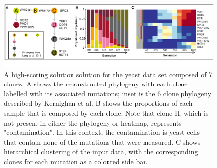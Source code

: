 \documentclass[a4paper]{article}\usepackage[]{graphicx}\usepackage[]{color}
\begin{document}

\begin{figure}[H]
    \centering
    \includegraphics[width=\textwidth]{BYB1_G07_abc.png}
    \caption{A high-scoring solution solution for the yeast data set composed of 7 clones.   A shows the reconstructed phylogeny
    with each clone labelled with its associated mutations; inset is the 6 clone phylogeny described by Kernighan et al.  B shows
    the proportions of each sample that is composed by each clone.  Note that clone H, which is not present
    in either the phylogeny or heatmap, represents "contamination".  In this context, the contamination is yeast cells 
    that contain none of the mutations that were measured.  C shows hierarchical clustering of the input data, with the
    corresponding clones for each mutation as a coloured side bar.}
\end{figure}
\end{document}
